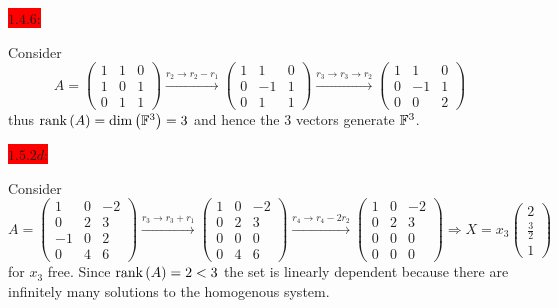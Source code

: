 \documentclass{exam}
\begin{document}
  \newpage 

  \colorbox{red}{\underline{$1.4.6$}:}
  \begin{solution}
    Consider 
    \[
      A = \begin{pmatrix}
        1 & 1 & 0 \\
        1 & 0 & 1 \\
        0 & 1 & 1
      \end{pmatrix}
      \xrightarrow{r_2 \to r_2 - r_1}
      \begin{pmatrix}
        1 & 1 & 0 \\
        0 & -1 & 1 \\
        0 & 1 & 1
      \end{pmatrix}
      \xrightarrow{r_3 \to r_3 \to r_2}
      \begin{pmatrix}
        1 & 1 & 0 \\
        0 & -1 & 1 \\
        0 & 0 & 2
      \end{pmatrix}
    \]
    thus $\text{rank}\left(A\right) = \dim{\left(\mathbb F^3\right)} = 3$ and hence the $3$ vectors generate $\mathbb F^3$.
  \end{solution}

  \colorbox{red}{\underline{$1.5.2d$}:}
  \begin{solution}
    Consider 
    \[
      A = \begin{pmatrix}
        1 & 0 & -2 \\
        0 & 2 & 3 \\
        -1 & 0 & 2 \\
        0 & 4 & 6 
      \end{pmatrix}
      \xrightarrow{r_3 \to r_3 + r_1}
      \begin{pmatrix}
        1 & 0 & -2 \\
        0 & 2 & 3 \\
        0 & 0 & 0 \\
        0 & 4 & 6
      \end{pmatrix}
      \xrightarrow{r_4 \to r_4 - 2r_2}
      \begin{pmatrix}
        1 & 0 & -2 \\
        0 & 2 & 3 \\
        0 & 0 & 0 \\
        0 & 0 & 0 
      \end{pmatrix} 
      \Rightarrow X = x_3\begin{pmatrix}
        2 \\
        \frac{3}{2} \\
        1
      \end{pmatrix}
    \]
    for $x_3$ free. Since $\text{rank}\left(A\right) = 2 < 3$ the set is linearly dependent because there are infinitely many solutions to the homogenous system.
  \end{solution}
\end{document}
